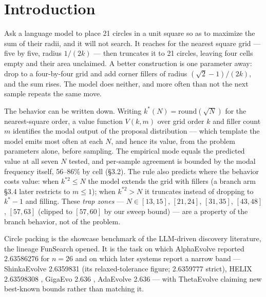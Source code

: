 \section{Introduction}

Ask a language model to place 21 circles in a unit square so as to maximize the sum of their
radii, and it will not search. It reaches for the nearest square grid --- five by five, radius
$1/(2k)$ --- then truncates it to 21 circles, leaving four cells empty and their area unclaimed.
A better construction is one parameter away: drop to a four-by-four grid and add corner fillers of
radius $(\sqrt{2}-1)/(2k)$, and the sum rises. The model does neither, and more often than not the
next sample repeats the same move.

The behavior can be written down. Writing $k^*(N) = \mathrm{round}(\sqrt{N})$ for the nearest-square
order, a value function $V(k, m)$ over grid order $k$ and filler count $m$ identifies the modal
output of the proposal distribution --- which template the model emits most often at each $N$, and
hence its value, from the problem parameters alone, before sampling. The empirical mode equals the
predicted value at all seven $N$ tested, and per-sample agreement is bounded by the modal frequency
itself, 56--86\% by cell (\S3.2). The rule also predicts where the behavior costs value: when
$k^{*2} \le N$ the model extends the grid with fillers (a branch arm \S3.4 later restricts to
$m \le 1$); when $k^{*2} > N$ it truncates instead of dropping to $k^*{-}1$ and filling. These
\emph{trap zones} --- $N \in [13,15]$, $[21,24]$, $[31,35]$, $[43,48]$, $[57,63]$ (clipped to
$[57,60]$ by our sweep bound) --- are a property of the branch behavior, not of the problem.

Circle packing is the showcase benchmark of the LLM-driven discovery literature, the lineage
FunSearch \citep{romeraparedes2024funsearch} opened. It is the task on
which AlphaEvolve \citep{novikov2025alphaevolve} reported 2.63586276 for $n = 26$ and
on which later systems report a narrow band --- ShinkaEvolve \citep{lange2025shinkaevolveopenendedsampleefficientprogram} 2.6359831 (its relaxed-tolerance figure; 2.6359777 strict), HELIX
2.63598308 \citep{su2026helixevolutionaryreinforcementlearning}, GigaEvo 2.636 \citep{khrulkov2025gigaevoopensourceoptimization}, AdaEvolve 2.636 \citep{cemri2026adaevolveadaptivellmdriven} --- with
ThetaEvolve \citep{wang2025thetaevolvetesttimelearningopen} claiming new best-known bounds rather than matching it.


